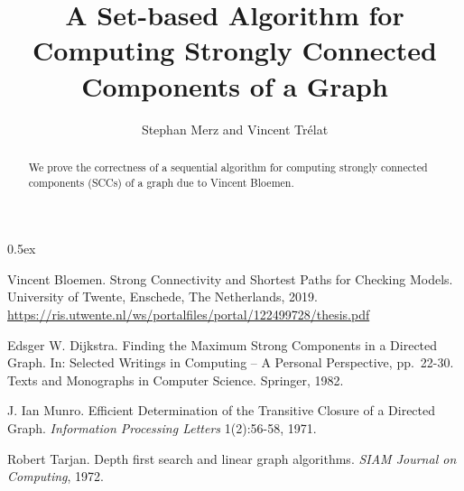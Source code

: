 \documentclass[11pt,a4paper]{article}
\begin{document}
\title{A Set-based Algorithm for Computing Strongly Connected Components of a Graph}
\author{Stephan Merz and Vincent Trélat}
\maketitle

\begin{abstract}
  We prove the correctness of a sequential algorithm for computing strongly
  connected components (SCCs) of a graph due to Vincent Bloemen.
\end{abstract}

\tableofcontents

\parindent 0pt\parskip 0.5ex



%
%

\begin{thebibliography}{9}
Vincent Bloemen.
\newblock Strong Connectivity and Shortest Paths for Checking Models.
\newblock University of Twente, Enschede, The Netherlands, 2019.
  \url{https://ris.utwente.nl/ws/portalfiles/portal/122499728/thesis.pdf}

Edsger W. Dijkstra.
\newblock Finding the Maximum Strong Components in a Directed Graph.
\newblock In: Selected Writings in Computing -- A Personal Perspective,
  pp.\ 22-30.
  Texts and Monographs in Computer Science. Springer, 1982.

J. Ian Munro.
\newblock Efficient Determination of the Transitive Closure of a Directed Graph.
\newblock \emph{Information Processing Letters} 1(2):56-58, 1971.

Robert Tarjan.
\newblock Depth first search and linear graph algorithms.
\newblock \emph{SIAM Journal on Computing}, 1972.
\end{thebibliography}
\end{document}
